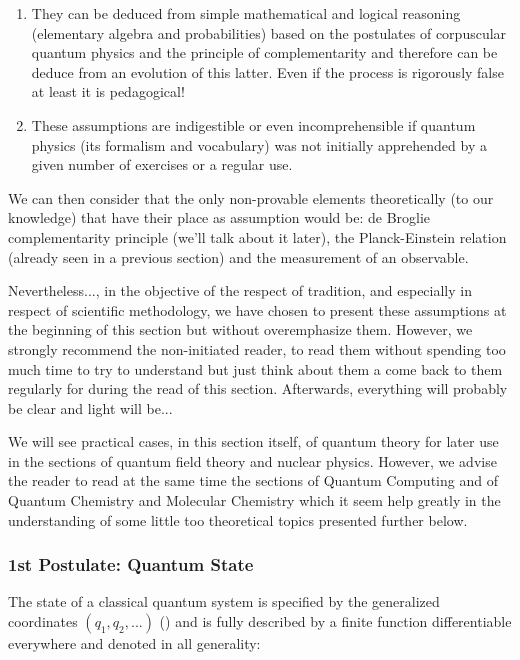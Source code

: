 	\begin{enumerate}
		\item They can be deduced from simple mathematical and logical reasoning (elementary algebra and probabilities) based on the postulates of corpuscular quantum physics and the principle of complementarity and therefore can be deduce from an evolution of this latter. Even if the process is rigorously false at least it is pedagogical!
		\item These assumptions are indigestible or even incomprehensible if quantum physics (its formalism and vocabulary) was not initially apprehended by a given number of exercises or a regular use.
	\end{enumerate}
	We can then consider that the only non-provable elements theoretically (to our knowledge) that have their place as assumption would be: de Broglie complementarity principle (we'll talk about it later), the Planck-Einstein relation (already seen in a previous section) and the measurement of an observable.
	
	Nevertheless..., in the objective of the respect of tradition, and especially in respect of scientific methodology, we have chosen to present these assumptions at the beginning of this section but without overemphasize them. However, we strongly recommend the non-initiated reader, to read them without spending too much time to try to understand but just think about them a come back to them regularly for during the read of this section. Afterwards, everything will probably be clear and light will be...

	
	\begin{tcolorbox}[title=Remark,colframe=black,arc=10pt]
	We will see practical cases, in this section itself, of quantum theory for later use in the sections of quantum field theory and nuclear physics. However, we advise the reader to read at the same time the sections of Quantum Computing and of Quantum Chemistry and Molecular Chemistry which it seem help greatly in the understanding of some little too theoretical topics presented further below.
	\end{tcolorbox}
	
	\subsubsection{1st Postulate: Quantum State}\label{first postulate wave quantum physics}
	The state of a classical quantum system is specified by the generalized coordinates $(q_1,q_2,...)$ () and is fully described by a finite function differentiable everywhere and denoted in all generality:
	
